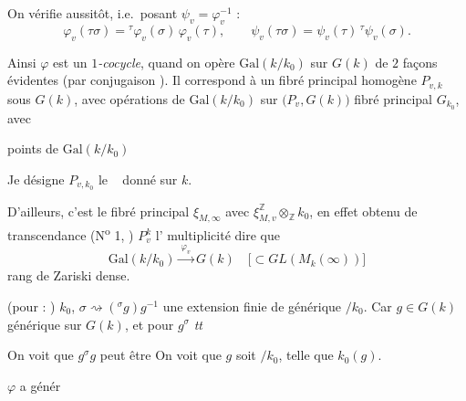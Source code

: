 \documentclass[11pt,a4paper]{article}
\begin{document}
On vérifie aussitôt, i.e.\ posant $\psi_{v} = \varphi_{v}^{-1}$ :
\[
  \varphi_{v}(\tau\sigma) = {}^{\tau}\varphi_{v}(\sigma)\, \varphi_{v}(\tau) ,
  \qquad
  \psi_{v}(\tau\sigma) = \psi_{v}(\tau)\, {}^{\tau}\psi_{v}(\sigma) .
\]


Ainsi $\varphi$ est un \emph{$1$-cocycle}, quand on  opère \ill{}
$\mathrm{Gal}(k/k_{0})$ sur $G(k)$ de $2$ façons évidentes \ill{} (par
conjugaison \ill{}). Il correspond à un fibré principal \ill{} homogène
$P_{v,k}$ sous $G(k)$, avec opérations de $\mathrm{Gal}(k/k_{0})$ sur
$\bigl(P_{v}, G(k)\bigr)$  \ill{} fibré principal
\ill{} $G_{k_{0}}$, avec \ill{}

\ill{} points de $\mathrm{Gal}(k/k_{0})$ \ill{} 

Je désigne $P_{v,k_{0}}$ \ill{} le \ill{} \ill{} \ \ill{}
donné sur $k$.

D'ailleurs, \ill{} c'est le \ill{} fibré principal $\xi_{M,\infty}$ avec
$\xi^{\mathbb{Z}}_{M,v} \otimes_{\mathbb{Z}} k_{0}$, \ill{} en effet obtenu
\ill{} de transcendance (N\textsuperscript{o} 1,  \ill{})
\ill{} $P_{v}^{k}$ \ill{} l' multiplicité \ill{} dire que
\[
  \mathrm{Gal}(k/k_{0}) \xrightarrow{\ \varphi_{v}\ } G(k)
  \quad\bigl[\subset GL(M_{k}(\infty))\bigr]
\]
\ill{} rang de Zariski \ill{} dense.



\ill{} (pour \ill{} : \ill{}) $k_{0}$, $\sigma \rightsquigarrow
({}^{\sigma}g) g^{-1}$  une extension
finie de  générique
$/k_{0}$. Car \ill{} $g \in G(k)$ \ill{} générique sur $G(k)$, et \ill{} pour
$g^{\sigma}$ \emph{tt} \ill{}

\ill{} On voit \ill{} que $g^{\sigma} g$ \ill{} peut  être
 \ill{} On voit \ill{} que $g$ soit 
$/k_{0}$, \ill{} telle que \ill{} \struck{($\sigma$)} \ill{} $k_{0}(g)$.

\ill{} $\varphi$ a \ill{} génér\ill{} \struck{\ill{}}
\end{document}
